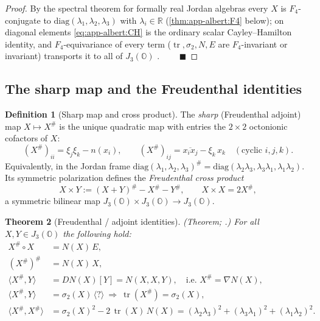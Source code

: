 \documentclass[11pt]{article}
\theoremstyle{plain}
\newtheorem{theorem}{Theorem}[section]
\theoremstyle{definition}
\newtheorem{definition}[theorem]{Definition}
\theoremstyle{remark}
\begin{document}
\begin{proof}
By the spectral theorem for formally real Jordan algebras every $X$ is
$F_4$-conjugate to $\mathrm{diag}(\lambda_1,\lambda_2,\lambda_3)$ with
$\lambda_i\in\mathbb R$ (\autoref{thm:app-albert:F4} below); on diagonal elements
\eqref{eq:app-albert:CH} is the ordinary scalar Cayley--Hamilton identity, and
$F_4$-equivariance of every term ($\operatorname{tr},\sigma_2,N,E$ are
$F_4$-invariant or invariant) transports it to all of $J_3(\mathbb O)$
\cite{McCrimmon:2004,Springer:2000}. $\qquad\blacksquare$
\end{proof}

\subsection{The sharp map and the Freudenthal identities}
\label{sec:app-albert:sharp}

\begin{definition}[Sharp map and cross product]\label{def:app-albert:sharp}
The \emph{sharp} (Freudenthal adjoint) map $X\mapsto X^\#$ is the unique quadratic
map with entries the $2\times2$ octonionic cofactors of $X$:
\begin{equation}\label{eq:app-albert:sharpentries}
  (X^\#)_{ii}=\xi_j\xi_k-n(x_i),
  \qquad
  (X^\#)_{ij}=\overline{x_i x_j}-\xi_k\,x_k
  \quad(\text{cyclic } i,j,k).
\end{equation}
Equivalently, in the Jordan frame
$\mathrm{diag}(\lambda_1,\lambda_2,\lambda_3)^\#
 =\mathrm{diag}(\lambda_2\lambda_3,\lambda_3\lambda_1,\lambda_1\lambda_2)$. Its
symmetric polarization defines the \emph{Freudenthal cross product}
\begin{equation}\label{eq:app-albert:cross}
  X\times Y:=(X+Y)^\#-X^\#-Y^\#,
  \qquad X\times X=2X^\#,
\end{equation}
a symmetric bilinear map $J_3(\mathbb O)\times J_3(\mathbb O)\to J_3(\mathbb O)$.
\end{definition}

\begin{theorem}[Freudenthal / adjoint identities]\label{thm:app-albert:freudenthal}
\textup{(Theorem; \cite{Freudenthal:1985,McCrimmon:2004,Springer:2000}.)}
For all $X,Y\in J_3(\mathbb O)$ the following hold:
\begin{align}
  X^\#\circ X &= N(X)\,E,
  \label{eq:app-albert:F1}\\
  (X^\#)^\# &= N(X)\,X,
  \label{eq:app-albert:F2}\\
  \langle X^\#,Y\rangle &= DN(X)[Y]
     = N(X,X,Y),
  \quad\text{i.e. } X^\#=\nabla N(X),
  \label{eq:app-albert:F3}\\
  \langle X^\#,Y\rangle &= \sigma_2(X)\,\langle?\rangle
     \ \Longrightarrow\
  \operatorname{tr}(X^\#)=\sigma_2(X),
  \label{eq:app-albert:F4}\\
  \langle X^\#,X^\#\rangle
     &= \sigma_2(X)^2-2\,\operatorname{tr}(X)\,N(X)
     = (\lambda_2\lambda_3)^2+(\lambda_3\lambda_1)^2+(\lambda_1\lambda_2)^2.
  \label{eq:app-albert:F5}
\end{align}
\end{theorem}
\end{document}
